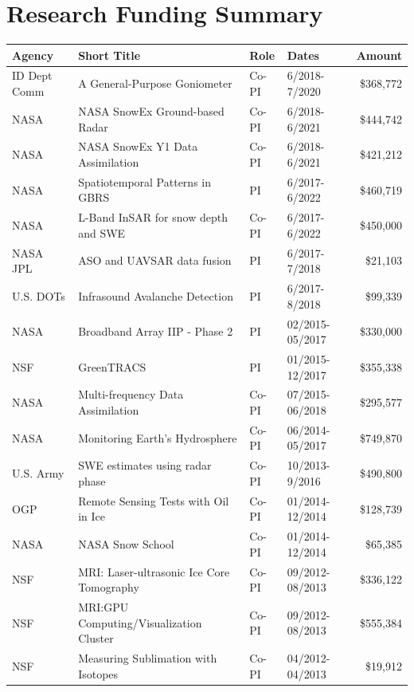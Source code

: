 \documentclass[11pt]{article}
\renewcommand\arraystretch{1}
\begin{document}
\begin{table}[!htbp]
\section*{Research Funding Summary}
\renewcommand\arraystretch{0.7}
  \centering
  \begin{tabular}{|l|l|l|l|r|}
\hline
\textbf{Agency} & \textbf{Short Title} & \textbf{Role} & \textbf{Dates} & \textbf{Amount} \\ \hline \hline
ID Dept Comm & A General-Purpose Goniometer & Co-PI & 6/2018-7/2020 & \$368,772 \\ \hline
NASA & NASA SnowEx Ground-based Radar & Co-PI & 6/2018-6/2021 &  \$444,742 \\ \hline
NASA & NASA SnowEx Y1 Data Assimilation & Co-PI & 6/2018-6/2021 &  \$421,212 \\ \hline
NASA & Spatiotemporal Patterns in GBRS & PI & 6/2017-6/2022 & \$460,719 \\ \hline
NASA & L-Band InSAR for snow depth and SWE & Co-PI & 6/2017-6/2022 & \$450,000 \\ \hline
NASA JPL & ASO and UAVSAR data fusion & PI &  6/2017-7/2018 & \$21,103 \\ \hline
U.S. DOTs & Infrasound Avalanche Detection & PI & 6/2017-8/2018 &  \$99,339 \\ \hline
NASA & Broadband Array IIP - Phase 2 & PI & 02/2015-05/2017 & \$330,000 \\ \hline
NSF & GreenTRACS & PI & 01/2015-12/2017 & \$355,338 \\ \hline
NASA & Multi-frequency Data Assimilation & Co-PI & 07/2015-06/2018 & \$295,577 \\ \hline
NASA & Monitoring Earth's Hydrosphere & Co-PI & 06/2014-05/2017 &  \$749,870  \\ \hline
U.S. Army & SWE estimates using radar phase & Co-PI & 10/2013- 9/2016 & \$490,800 \\ \hline
OGP & Remote Sensing Tests with Oil in Ice & Co-PI & 01/2014-12/2014 & \$128,739 \\ \hline
NASA & NASA Snow School & Co-PI & 01/2014-12/2014 & \$65,385 \\ \hline
NSF & MRI: Laser-ultrasonic Ice Core Tomography & Co-PI & 09/2012-08/2013 & \$336,122 \\ \hline
NSF & MRI:GPU Computing/Visualization Cluster & Co-PI & 09/2012-08/2013 & \$555,384 \\ \hline
NSF & Measuring Sublimation with Isotopes & Co-PI & 04/2012-04/2013 & \$19,912 \\ \hline

\end{tabular}
\end{table}
\end{document}

